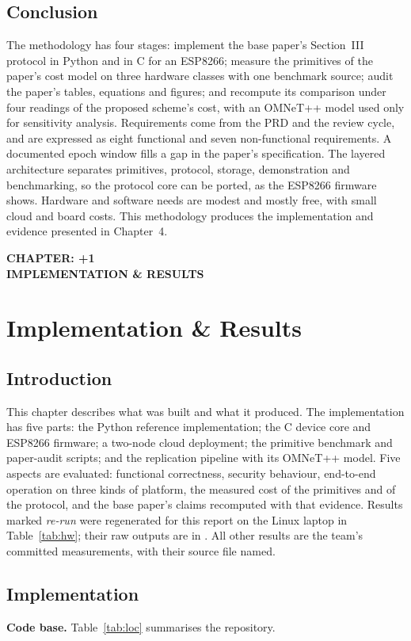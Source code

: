 \documentclass[12pt,a4paper,oneside]{report}
\numberwithin{equation}{chapter}
\newcommand{\ChapterDivider}[1]{%
  \clearpage\thispagestyle{empty}\null\vfill
  \begin{center}{\large\bfseries CHAPTER: \number\numexpr\value{chapter}+1\relax}\\[1.2in]{\large\bfseries\MakeUppercase{#1}}\end{center}
  \vfill\null\clearpage}
\begin{document}
\section{Conclusion}
The methodology has four stages: implement the base paper's Section~III protocol in Python and in C for an ESP8266; measure the primitives of the paper's cost model on three hardware classes with one benchmark source; audit the paper's tables, equations and figures; and recompute its comparison under four readings of the proposed scheme's cost, with an OMNeT++ model used only for sensitivity analysis. Requirements come from the PRD and the review cycle, and are expressed as eight functional and seven non-functional requirements. A documented epoch window fills a gap in the paper's specification. The layered architecture separates primitives, protocol, storage, demonstration and benchmarking, so the protocol core can be ported, as the ESP8266 firmware shows. Hardware and software needs are modest and mostly free, with small cloud and board costs. This methodology produces the implementation and evidence presented in Chapter~4.

\ChapterDivider{Implementation \& Results}
\chapter{Implementation \& Results}
\section{Introduction}
This chapter describes what was built and what it produced. The implementation has five parts: the Python reference implementation; the C device core and ESP8266 firmware; a two-node cloud deployment; the primitive benchmark and paper-audit scripts; and the replication pipeline with its OMNeT++ model. Five aspects are evaluated: functional correctness, security behaviour, end-to-end operation on three kinds of platform, the measured cost of the primitives and of the protocol, and the base paper's claims recomputed with that evidence. Results marked \emph{re-run} were regenerated for this report on the Linux laptop in Table~\ref{tab:hw}; their raw outputs are in . All other results are the team's committed measurements, with their source file named.

\section{Implementation}
\textbf{Code base.} Table~\ref{tab:loc} summarises the repository.
\end{document}
